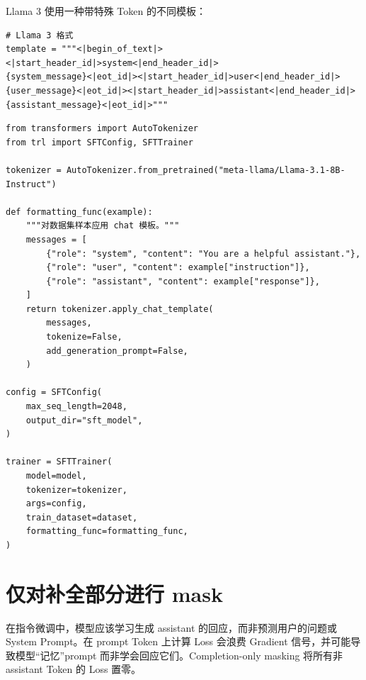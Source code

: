 Llama 3 使用一种带特殊 Token 的不同模板：

\begin{lstlisting}[style=pythonstyle]
# Llama 3 格式
template = """<|begin_of_text|><|start_header_id|>system<|end_header_id|>
{system_message}<|eot_id|><|start_header_id|>user<|end_header_id|>
{user_message}<|eot_id|><|start_header_id|>assistant<|end_header_id|>
{assistant_message}<|eot_id|>"""
\end{lstlisting}

\begin{examplebox}
\begin{lstlisting}[style=pythonstyle]
from transformers import AutoTokenizer
from trl import SFTConfig, SFTTrainer

tokenizer = AutoTokenizer.from_pretrained("meta-llama/Llama-3.1-8B-Instruct")

def formatting_func(example):
    """对数据集样本应用 chat 模板。"""
    messages = [
        {"role": "system", "content": "You are a helpful assistant."},
        {"role": "user", "content": example["instruction"]},
        {"role": "assistant", "content": example["response"]},
    ]
    return tokenizer.apply_chat_template(
        messages,
        tokenize=False,
        add_generation_prompt=False,
    )

config = SFTConfig(
    max_seq_length=2048,
    output_dir="sft_model",
)

trainer = SFTTrainer(
    model=model,
    tokenizer=tokenizer,
    args=config,
    train_dataset=dataset,
    formatting_func=formatting_func,
)
\end{lstlisting}
\end{examplebox}

\section{仅对补全部分进行 mask}
\label{sec:completion-masking}

\begin{intuitionbox}[为何要 mask prompt?]
在指令微调中，模型应该学习生成 assistant 的回应，而非预测用户的问题或 System Prompt。在 prompt Token 上计算 Loss 会浪费 Gradient 信号，并可能导致模型“记忆”prompt 而非学会回应它们。Completion-only masking 将所有非 assistant Token 的 Loss 置零。
\end{intuitionbox}

